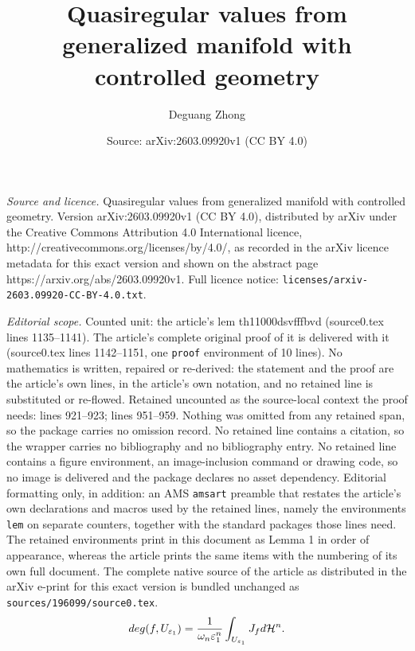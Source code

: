 \documentclass[10pt,a4paper]{amsart}
\title{Quasiregular values from generalized manifold with controlled geometry}
\author{Deguang Zhong}
\date{Source: arXiv:2603.09920v1 (CC BY 4.0)}
\begin{document}
\maketitle

\noindent\emph{Source and licence.} Quasiregular values from generalized manifold with controlled geometry. Version arXiv:2603.09920v1 (CC BY 4.0), distributed by arXiv under the Creative Commons Attribution 4.0 International licence, http://creativecommons.org/licenses/by/4.0/, as recorded in the arXiv licence metadata for this exact version and shown on the abstract page https://arxiv.org/abs/2603.09920v1. Full licence notice: \texttt{licenses/arxiv-2603.09920-CC-BY-4.0.txt}.\par\smallskip

\noindent\textit{Editorial scope.} Counted unit: the article's lem th11000dsvfffbvd (source0.tex lines 1135--1141). The article's complete original proof of it is delivered with it (source0.tex lines 1142--1151, one \texttt{proof} environment of 10 lines). No mathematics is written, repaired or re-derived: the statement and the proof are the article's own lines, in the article's own notation, and no retained line is substituted or re-flowed.  Retained uncounted as the source-local context the proof needs: lines 921--923; lines 951--959.  Nothing was omitted from any retained span, so the package carries no omission record.  No retained line contains a citation, so the wrapper carries no bibliography and no bibliography entry.  No retained line contains a figure environment, an image-inclusion command or drawing code, so no image is delivered and the package declares no asset dependency.  Editorial formatting only, in addition: an AMS \texttt{amsart} preamble that restates the article's own declarations and macros used by the retained lines, namely the environments \texttt{lem} on separate counters, together with the standard packages those lines need.  The retained environments print in this document as Lemma 1 in order of appearance, whereas the article prints the same items with the numbering of its own full document.  The complete native source of the article as distributed in the arXiv e-print for this exact version is bundled unchanged as \texttt{sources/196099/source0.tex}.
\begin{equation}\label{shdhjsa}
{\rm deg}(f,U_{\varepsilon_{1}})=\frac{1}{\omega_{n}\varepsilon_{1}^{n}}\int_{U_{\varepsilon_{1}}}J_{f}d\mathcal{H}^{n}.
\end{equation}
\end{document}
